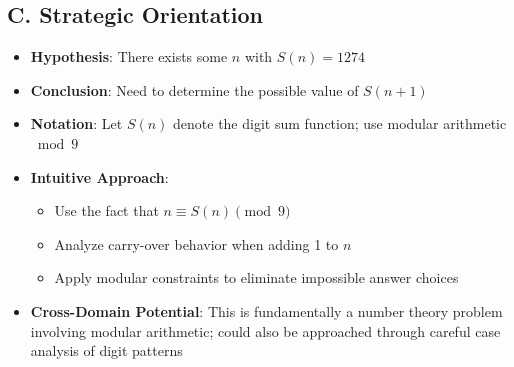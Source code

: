 \documentclass[]{article}
\begin{document}
\begin{problemconfigbox}
\subsection*{C. Strategic Orientation}
\begin{itemize}[leftmargin=*]
    \item \textbf{Hypothesis}: There exists some $n$ with $S(n) = 1274$
    \item \textbf{Conclusion}: Need to determine the possible value of $S(n+1)$
    \item \textbf{Notation}: Let $S(n)$ denote the digit sum function; use modular arithmetic $\bmod 9$
    \item \textbf{Intuitive Approach}: 
    \begin{itemize}
        \item Use the fact that $n \equiv S(n) \pmod{9}$
        \item Analyze carry-over behavior when adding 1 to $n$
        \item Apply modular constraints to eliminate impossible answer choices
    \end{itemize}
    \item \textbf{Cross-Domain Potential}: This is fundamentally a number theory problem involving modular arithmetic; could also be approached through careful case analysis of digit patterns
\end{itemize}
\end{problemconfigbox}
\end{document}
